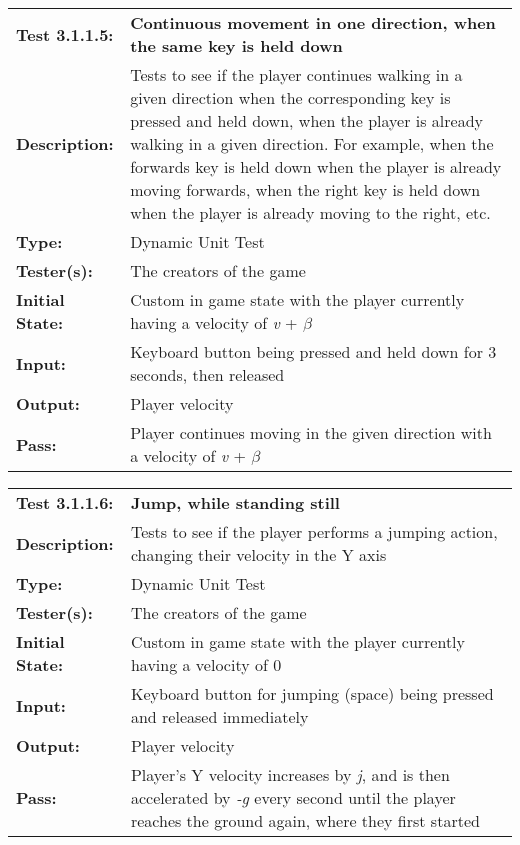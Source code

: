 \documentclass[12pt, titlepage]{article}
\begin{document}
\begin{mdframed}[linewidth=1pt]
\begin{tabularx}{\textwidth}{@{}p{3cm}X@{}}
{\bf Test 3.1.1.5:} & {\bf Continuous movement in one direction, when the same key is held down}\\[\baselineskip]
{\bf Description:} & Tests to see if the player continues walking in a given direction when the corresponding key is pressed and held down, when the player is already walking in a given direction. For example, when the forwards key is held down when the player is already moving forwards, when the right key is held down when the player is already moving to the right, etc.\\[0.5\baselineskip]
{\bf Type:} & Dynamic Unit Test\\[0.5\baselineskip]
{\bf Tester(s):} & The creators of the game\\[0.5\baselineskip]
{\bf Initial State:} & Custom in game state with the player currently having a velocity of \textit{v} + $\beta$ \\[0.5\baselineskip]
{\bf Input:} & Keyboard button being pressed and held down for 3 seconds, then released\\[0.5\baselineskip]
{\bf Output:} & Player velocity\\[0.5\baselineskip]
{\bf Pass:} & Player continues moving in the given direction with a velocity of \textit{v} + $\beta$
\end{tabularx}
\end{mdframed}


\begin{mdframed}[linewidth=1pt]
\begin{tabularx}{\textwidth}{@{}p{3cm}X@{}}
{\bf Test 3.1.1.6:} & {\bf Jump, while standing still}\\[\baselineskip]
{\bf Description:} & Tests to see if the player performs a jumping action, changing their velocity in the Y axis\\[0.5\baselineskip]
{\bf Type:} & Dynamic Unit Test\\[0.5\baselineskip]
{\bf Tester(s):} & The creators of the game\\[0.5\baselineskip]
{\bf Initial State:} & Custom in game state with the player currently having a velocity of 0\\[0.5\baselineskip]
{\bf Input:} & Keyboard button for jumping (space) being pressed and released immediately\\[0.5\baselineskip]
{\bf Output:} & Player velocity\\[0.5\baselineskip]
{\bf Pass:} & Player's Y velocity increases by \textit{j}, and is then accelerated by \textit{-g} every second until the player reaches the ground again, where they first started
\end{tabularx}
\end{mdframed}
\end{document}
